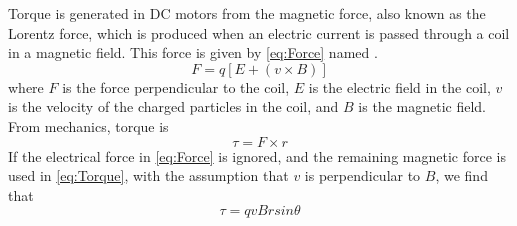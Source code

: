     Torque is generated in DC motors from the magnetic force,
    also known as the Lorentz force, which is produced when an
    electric current is passed through a coil in a magnetic field.
    This force is given by \ref{eq:Force} named .
    \begin{equation}
      F=q[E+(v\times B)]
      \label{eq:Force}
    \end{equation}
    where $F$ is the force perpendicular to the coil,
    $E$ is the electric field in the coil,
    $v$ is the velocity of the charged particles in the coil,
    and $B$ is the magnetic field. From mechanics, torque is
    \begin{equation}
      \tau=F\times r
      \label{eq:Torque}
    \end{equation}
    If the electrical force in \ref{eq:Force} is ignored,
    and the remaining magnetic force is used in \ref{eq:Torque},
    with the assumption that $v$ is perpendicular to $B$, we find that
    \begin{equation}
          \tau=qvBrsin\theta
      \label{eq:Magnetic}
    \end{equation}